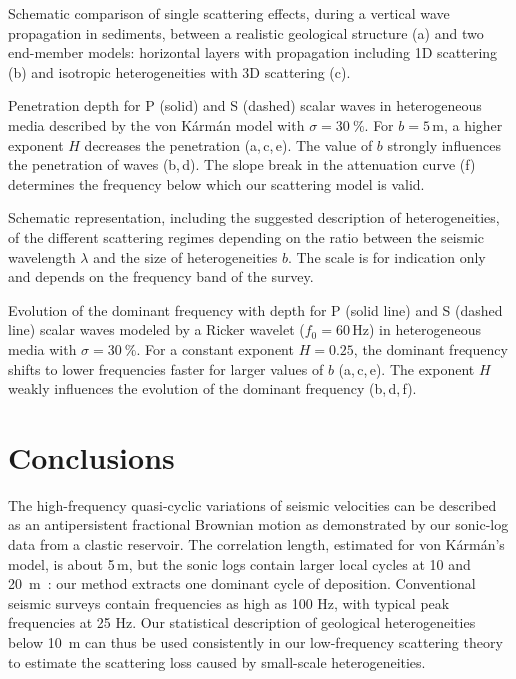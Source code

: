 {Schematic comparison of single scattering effects,
during a vertical wave propagation in sediments,
between a realistic geological structure (a) and two end-member models:
horizontal layers with propagation including 1D scattering (b)
and isotropic heterogeneities with 3D scattering (c).}

{Penetration depth for P (solid) and S (dashed) scalar waves
in heterogeneous media described by the von K\'arm\'an model with $\sigma=30~\%$.
For $b=5$\,m, a higher exponent $H$ decreases the penetration (a,\,c,\,e).
The value of $b$ strongly influences the penetration of waves (b,\,d).
The slope break in the attenuation curve (f) determines the frequency below which our scattering model
is valid.}

{Schematic representation, including the suggested description of heterogeneities, 
of the different scattering regimes depending on the ratio between
the seismic wavelength $\lambda$ and the size of heterogeneities $b$.
The scale is for indication only and depends on the frequency band of the survey.}

{Evolution of the dominant frequency with depth for P (solid line) and S (dashed line) scalar waves modeled by a Ricker wavelet ($f_0=60$\,Hz)
in heterogeneous media with $\sigma=30~\%$. For a constant exponent $H=0.25$, 
the dominant frequency shifts to lower frequencies faster for larger values of $b$ (a,\,c,\,e).
The exponent $H$ weakly influences the evolution of the dominant frequency (b,\,d,\,f).}


\section{Conclusions}


The high-frequency quasi-cyclic variations of seismic velocities
can be described as an antipersistent fractional Brownian motion
as demonstrated by our sonic-log data from a clastic reservoir.
The correlation length, estimated for von K\'arm\'an's model,
is about 5\,m, but the sonic logs contain
larger local cycles at 10 and 20~m~: our method extracts  
one dominant cycle of deposition.
Conventional seismic surveys contain frequencies as high as 100 Hz,
with typical peak frequencies at 25 Hz.
Our statistical description of geological heterogeneities below 10~m
can thus be used consistently in our low-frequency scattering theory
to estimate the scattering loss caused by small-scale heterogeneities.

